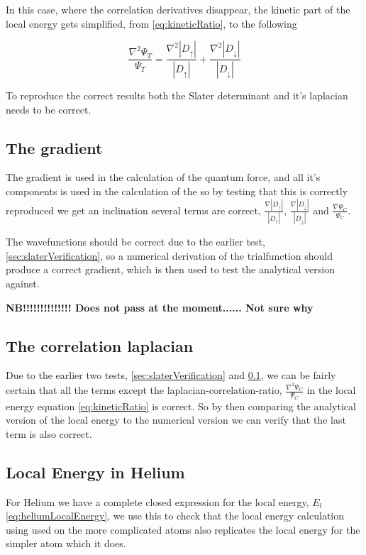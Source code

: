 			In this case, where the correlation derivatives disappear, the kinetic part of the local energy gets simplified, from \eqref{eq:kineticRatio}, to the following

			\[\frac{\nabla^2 \Psi_T}{\Psi_T} = \frac{\nabla^2 |D_\uparrow|}{|D_\uparrow|} + \frac{\nabla^2 |D_\downarrow|}{|D_\downarrow|}  \]

			To reproduce the correct results both the Slater determinant and it's laplacian needs to be correct.

		\subsection{The gradient}
			\label{sec:gradientVerification}
			The gradient is used in the calculation of the quantum force, and all it's components is used in the calculation of the so by testing that this is correctly reproduced we get an inclination several terms are correct, \(\frac{\nabla |D_\uparrow|}{|D_\uparrow|} \), \( \frac{\nabla |D_\downarrow|}{|D_\downarrow|} \) and \( \frac{\nabla \Psi_C}{\Psi_C} \).

			The wavefunctions should be correct due to the earlier test, \ref{sec:slaterVerification}, so a numerical derivation of the trialfunction should produce a correct gradient, which is then used to test the analytical version against.


			\textbf{NB!!!!!!!!!!!!!! Does not pass at the moment...... Not sure why}

		\subsection{The correlation laplacian}
			\label{sec:laplacianCorrelationVerification}

			Due to the earlier two tests, \ref{sec:slaterVerification} and \ref{sec:gradientVerification}, we can be fairly certain that all the terms except the laplacian-correlation-ratio, \(\frac{\nabla^2\Psi_C}{\Psi_C}\) in the local energy equation \eqref{eq:kineticRatio} is correct. So by then comparing the analytical version of the local energy to the numerical version we can verify that the last term is also correct.

		\subsection{Local Energy in Helium}
			For Helium we have a complete closed expression for the local energy, \(E_l\) \eqref{eq:heliumLocalEnergy}, we use this to check that the local energy calculation using used on the more complicated atoms  also replicates the local energy for the simpler atom which it does. 



